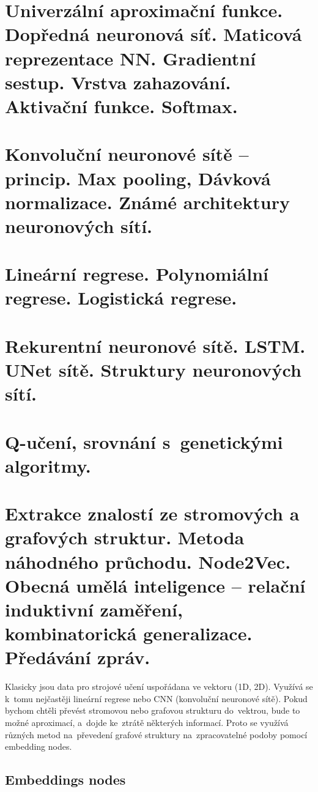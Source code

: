 \clearpage
\section{Univerzální aproximační funkce. Dopředná neuronová síť. Maticová reprezentace NN. Gradientní sestup. Vrstva zahazování. Aktivační funkce. Softmax.}


\clearpage
\section{Konvoluční neuronové sítě – princip. Max pooling, Dávková normalizace. Známé architektury neuronových sítí.}


\clearpage
\section{Lineární regrese. Polynomiální regrese. Logistická regrese.}


\clearpage
\section{Rekurentní neuronové sítě. LSTM. UNet sítě. Struktury neuronových sítí.}


\clearpage
\section{Q-učení, srovnání s~genetickými algoritmy.}

\clearpage
\section{Extrakce znalostí ze stromových a grafových struktur. Metoda náhodného průchodu. Node2Vec. Obecná umělá inteligence – relační induktivní zaměření, kombinatorická generalizace. Předávání zpráv.}

Klasicky jsou data pro strojové učení uspořádana ve vektoru (1D, 2D). 
Využívá se k~tomu nejčastěji lineární regrese nebo CNN (konvoluční neuronové sítě). 
Pokud bychom chtěli převést stromovou nebo grafovou strukturu do~vektrou, bude to možné aproximací, a~dojde ke~ztrátě některých informací.
Proto se využívá různých metod na~převedení grafové struktury na~zpracovatelné podoby pomocí embedding nodes.

\subsection{Embeddings nodes}

